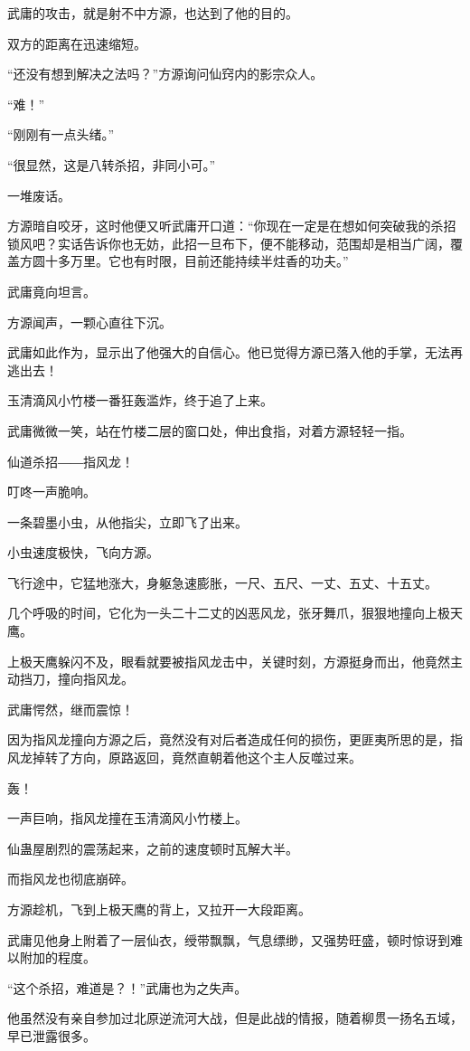 \begin{this_body}
武庸的攻击，就是射不中方源，也达到了他的目的。

双方的距离在迅速缩短。

“还没有想到解决之法吗？”方源询问仙窍内的影宗众人。

“难！”

“刚刚有一点头绪。”

“很显然，这是八转杀招，非同小可。”

一堆废话。

方源暗自咬牙，这时他便又听武庸开口道：“你现在一定是在想如何突破我的杀招锁风吧？实话告诉你也无妨，此招一旦布下，便不能移动，范围却是相当广阔，覆盖方圆十多万里。它也有时限，目前还能持续半炷香的功夫。”

武庸竟向坦言。

方源闻声，一颗心直往下沉。

武庸如此作为，显示出了他强大的自信心。他已觉得方源已落入他的手掌，无法再逃出去！

玉清滴风小竹楼一番狂轰滥炸，终于追了上来。

武庸微微一笑，站在竹楼二层的窗口处，伸出食指，对着方源轻轻一指。

仙道杀招――指风龙！

叮咚一声脆响。

一条碧墨小虫，从他指尖，立即飞了出来。

小虫速度极快，飞向方源。

飞行途中，它猛地涨大，身躯急速膨胀，一尺、五尺、一丈、五丈、十五丈。

几个呼吸的时间，它化为一头二十二丈的凶恶风龙，张牙舞爪，狠狠地撞向上极天鹰。

上极天鹰躲闪不及，眼看就要被指风龙击中，关键时刻，方源挺身而出，他竟然主动挡刀，撞向指风龙。

武庸愕然，继而震惊！

因为指风龙撞向方源之后，竟然没有对后者造成任何的损伤，更匪夷所思的是，指风龙掉转了方向，原路返回，竟然直朝着他这个主人反噬过来。

轰！

一声巨响，指风龙撞在玉清滴风小竹楼上。

仙蛊屋剧烈的震荡起来，之前的速度顿时瓦解大半。

而指风龙也彻底崩碎。

方源趁机，飞到上极天鹰的背上，又拉开一大段距离。

武庸见他身上附着了一层仙衣，绶带飘飘，气息缥缈，又强势旺盛，顿时惊讶到难以附加的程度。

“这个杀招，难道是？！”武庸也为之失声。

他虽然没有亲自参加过北原逆流河大战，但是此战的情报，随着柳贯一扬名五域，早已泄露很多。


\end{this_body}
